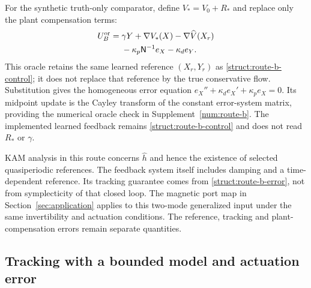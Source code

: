 For the synthetic truth-only comparator, define $V_*=V_0+R_*$ and replace only the plant compensation terms:
\begin{equation}\label{struct:route-b-oracle}
\begin{aligned}
 U_B^{\rm or}={}&\gamma Y+\nabla V_*(X)
                         -\nabla\widehat V(X_r)\\
              &-\kappa_p\mathsf N^{-1}e_X-\kappa_de_Y.
\end{aligned}
\end{equation}
This oracle retains the same learned reference $(X_r,Y_r)$ as \eqref{struct:route-b-control}; it does not replace that reference by the true conservative flow. Substitution gives the homogeneous error equation $e_X''+\kappa_de_X'+\kappa_pe_X=0$. Its midpoint update is the Cayley transform of the constant error-system matrix, providing the numerical oracle check in Supplement~\ref{num:route-b}. The implemented learned feedback remains \eqref{struct:route-b-control} and does not read $R_*$ or $\gamma$.

KAM analysis in this route concerns $\widehat h$ and hence the existence of selected quasiperiodic references. The feedback system itself includes damping and a time-dependent reference. Its tracking guarantee comes from \eqref{struct:route-b-error}, not from symplecticity of that closed loop. The magnetic port map in Section~\ref{sec:application} applies to this two-mode generalized input under the same invertibility and actuation conditions. The reference, tracking and plant-compensation errors remain separate quantities.

\subsection{Tracking with a bounded model and actuation error}
\label{ss:tracking}

